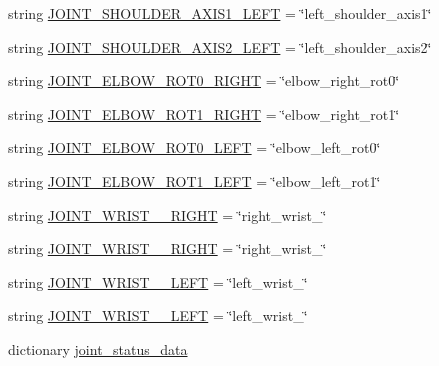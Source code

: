 \begin{DoxyCompactItemize}
string \mbox{\hyperlink{namespacesteering__response__test_a9885102d1647040c9b321f9157dfde06}{J\+O\+I\+N\+T\+\_\+\+S\+H\+O\+U\+L\+D\+E\+R\+\_\+\+A\+X\+I\+S1\+\_\+\+L\+E\+FT}} = \char`\"{}left\+\_\+shoulder\+\_\+axis1\char`\"{}
\item 
string \mbox{\hyperlink{namespacesteering__response__test_a47cc4f7d066ad25bb85f4ed63c793054}{J\+O\+I\+N\+T\+\_\+\+S\+H\+O\+U\+L\+D\+E\+R\+\_\+\+A\+X\+I\+S2\+\_\+\+L\+E\+FT}} = \char`\"{}left\+\_\+shoulder\+\_\+axis2\char`\"{}
\item 
string \mbox{\hyperlink{namespacesteering__response__test_a426b8603fc0de57c8c8cc8c05577b077}{J\+O\+I\+N\+T\+\_\+\+E\+L\+B\+O\+W\+\_\+\+R\+O\+T0\+\_\+\+R\+I\+G\+HT}} = \char`\"{}elbow\+\_\+right\+\_\+rot0\char`\"{}
\item 
string \mbox{\hyperlink{namespacesteering__response__test_addb45aac0c528f48900604e39602ec1d}{J\+O\+I\+N\+T\+\_\+\+E\+L\+B\+O\+W\+\_\+\+R\+O\+T1\+\_\+\+R\+I\+G\+HT}} = \char`\"{}elbow\+\_\+right\+\_\+rot1\char`\"{}
\item 
string \mbox{\hyperlink{namespacesteering__response__test_a7a727b69521b77e84bb027f0a0ae0cf5}{J\+O\+I\+N\+T\+\_\+\+E\+L\+B\+O\+W\+\_\+\+R\+O\+T0\+\_\+\+L\+E\+FT}} = \char`\"{}elbow\+\_\+left\+\_\+rot0\char`\"{}
\item 
string \mbox{\hyperlink{namespacesteering__response__test_ac0da61549c92a4fc46f6023465ed8a3f}{J\+O\+I\+N\+T\+\_\+\+E\+L\+B\+O\+W\+\_\+\+R\+O\+T1\+\_\+\+L\+E\+FT}} = \char`\"{}elbow\+\_\+left\+\_\+rot1\char`\"{}
\item 
string \mbox{\hyperlink{namespacesteering__response__test_aa21beb6d4b23f4aa1c334fbcd3c2d445}{J\+O\+I\+N\+T\+\_\+\+W\+R\+I\+S\+T\+\_\+\_\+\+R\+I\+G\+HT}} = \char`\"{}right\+\_\+wrist\+\_\char`\"{}
\item 
string \mbox{\hyperlink{namespacesteering__response__test_a6efb7e9ec80ac62557cfbf1c3eedd50d}{J\+O\+I\+N\+T\+\_\+\+W\+R\+I\+S\+T\+\_\+\_\+\+R\+I\+G\+HT}} = \char`\"{}right\+\_\+wrist\+\_\char`\"{}
\item 
string \mbox{\hyperlink{namespacesteering__response__test_a2172d125436856b275e519cd2362630b}{J\+O\+I\+N\+T\+\_\+\+W\+R\+I\+S\+T\+\_\+\_\+\+L\+E\+FT}} = \char`\"{}left\+\_\+wrist\+\_\char`\"{}
\item 
string \mbox{\hyperlink{namespacesteering__response__test_af01a564a0a9633b0deff25e4cb71349c}{J\+O\+I\+N\+T\+\_\+\+W\+R\+I\+S\+T\+\_\+\_\+\+L\+E\+FT}} = \char`\"{}left\+\_\+wrist\+\_\char`\"{}
\item 
dictionary \mbox{\hyperlink{namespacesteering__response__test_ad6d872e5ff5bdea8a1d2dd0fd702ebbd}{joint\+\_\+status\+\_\+data}}

\end{DoxyCompactItemize}
